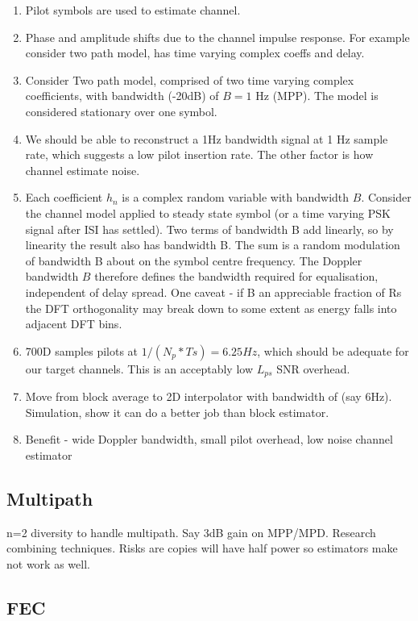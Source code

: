 \documentclass{article}
\begin{document}
\begin{enumerate}
\item Pilot symbols are used to estimate channel.
\item Phase and amplitude shifts due to the channel impulse response.  For example consider two path model, has time varying complex coeffs and delay.
\item Consider Two path  model, comprised of two time varying complex coefficients, with bandwidth (-20dB) of $B=1$ Hz (MPP).  The model is considered stationary over one symbol.
\item We should be able to reconstruct a 1Hz bandwidth signal at 1 Hz sample rate, which suggests a low pilot insertion rate.  The other factor is how channel estimate noise.
\item Each coefficient $h_n$ is a complex random variable with bandwidth $B$. Consider the channel model applied to steady state symbol (or a time varying PSK signal after ISI has settled). Two terms of bandwidth B add linearly, so by linearity the result also has bandwidth B.  The sum is a random modulation of bandwidth B about on the symbol centre frequency.  The Doppler bandwidth $B$ therefore defines the bandwidth required for equalisation, independent of delay spread. One caveat - if B an appreciable fraction of Rs the DFT orthogonality may break down to some extent as energy falls into adjacent DFT bins.
\item 700D samples pilots at $1/(N_p*Ts)=6.25 \si{Hz}$, which should be adequate for our target channels.  This is an acceptably low $L_{ps}$ SNR overhead.
\item Move from block average to 2D interpolator with bandwidth of (say 6Hz).  Simulation, show it can do a better job than block estimator.
\item Benefit - wide Doppler bandwidth, small pilot overhead, low noise channel estimator
\end{enumerate}

\subsection{Multipath}

n=2 diversity to handle multipath.  Say 3dB gain on MPP/MPD.  Research combining techniques. Risks are copies will have half power so estimators make not work as well.

\subsection{FEC}
\end{document}

